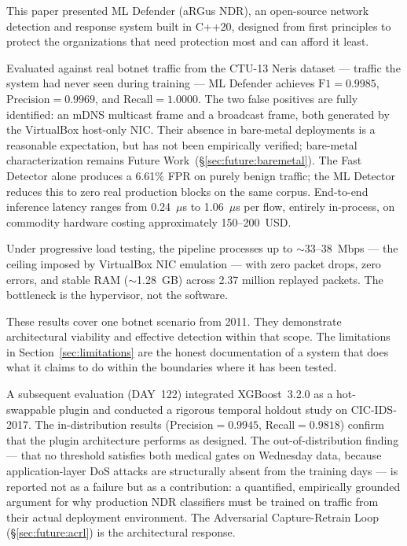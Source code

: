 \documentclass[11pt,a4paper]{article}
\begin{document}
    This paper presented ML Defender (aRGus NDR), an open-source network detection and response
    system built in C++20, designed from first principles to protect the organizations that need
    protection most and can afford it least.

    Evaluated against real botnet traffic from the CTU-13 Neris dataset --- traffic the system
    had never seen during training --- ML Defender achieves $\text{F1} = 0.9985$,
    $\text{Precision} = 0.9969$, and $\text{Recall} = 1.0000$. The two false positives are fully
    identified: an mDNS multicast frame and a broadcast frame, both generated by the VirtualBox
    host-only NIC. Their absence in bare-metal deployments is a reasonable expectation, but has
    not been empirically verified; bare-metal characterization remains Future
    Work~(\S\ref{sec:future:baremetal}). The Fast Detector alone produces a 6.61\% FPR on purely
    benign traffic; the ML Detector reduces this to zero real production blocks on the same corpus.
    End-to-end inference latency ranges from 0.24~$\mu$s to 1.06~$\mu$s per flow, entirely
    in-process, on commodity hardware costing approximately 150--200~USD.

    Under progressive load testing, the pipeline processes up to ${\sim}$33--38~Mbps --- the
    ceiling imposed by VirtualBox NIC emulation --- with zero packet drops, zero errors, and
    stable RAM (${\sim}$1.28~GB) across 2.37 million replayed packets. The bottleneck is the
    hypervisor, not the software.

    These results cover one botnet scenario from 2011. They demonstrate architectural viability
    and effective detection within that scope. The limitations in Section~\ref{sec:limitations}
    are the honest documentation of a system that does what it claims to do within the boundaries
    where it has been tested.

    A subsequent evaluation (DAY~122) integrated XGBoost~3.2.0 as a hot-swappable plugin and
    conducted a rigorous temporal holdout study on CIC-IDS-2017. The in-distribution results
    (Precision$=0.9945$, Recall$=0.9818$) confirm that the plugin architecture performs as
    designed. The out-of-distribution finding --- that no threshold satisfies both medical gates
    on Wednesday data, because application-layer DoS attacks are structurally absent from the
    training days --- is reported not as a failure but as a contribution: a quantified,
    empirically grounded argument for why production NDR classifiers must be trained on traffic
    from their actual deployment environment. The Adversarial Capture-Retrain Loop
    (\S\ref{sec:future:acrl}) is the architectural response.
\end{document}
